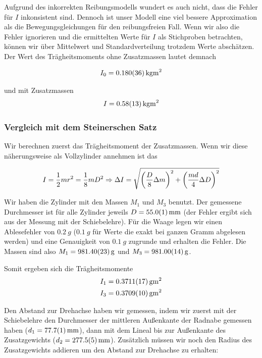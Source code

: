 \documentclass[a4paper,german,12pt,smallheadings]{scrartcl}
\begin{document}
Aufgrund des inkorrekten Reibungsmodells wundert es auch nicht, dass die Fehler
für $I$ inkonsistent sind. Dennoch ist unser Modell eine viel bessere
Approximation als die Bewegungsgleichungen für den reibungsfreien Fall. Wenn
wir also die Fehler ignorieren und die ermittelten Werte für $I$ als
Stichproben betrachten, können wir über Mittelwert und Standardverteilung
trotzdem Werte abschätzen. Der Wert des Trägheitsmoments ohne Zusatzmassen
lautet demnach

\begin{equation}
  I_0 = \SI{0.180+-0.036}{kg m^2}
\end{equation}

und mit Zusatzmassen
\begin{equation}
  I = \SI{0.58+-0.13}{kg m^2}
\end{equation}

\subsubsection{Vergleich mit dem Steinerschen Satz}
Wir berechnen zuerst das Trägheitsmoment der Zusatzmassen. Wenn wir diese
näherungsweise als Vollzylinder annehmen ist das

\begin{equation}
  I = \frac{1}{2} m r^2 = \frac{1}{8} mD^2 \Rightarrow
  \Delta I = \sqrt{\del{\frac{D}{8} \Delta m}^2 + \del{\frac{md}{4} \Delta D}^2}
\end{equation}

Wir haben die Zylinder mit den Massen $M_1$ und $M_3$ benutzt. Der gemessene
Durchmesser ist für alle Zylinder jeweils $D = \SI{55.0+-0.1}{mm}$ (der Fehler
ergibt sich aus der Messung mit der Schiebelehre). Für die Waage legen wir
einen Ablesefehler von $\SI{0.2}{g}$ ($\SI{0.1}{g}$ für Werte die exakt bei
ganzen Gramm abgelesen werden) und eine Genauigkeit von $\SI{0.1}{g}$ zugrunde
und erhalten die Fehler. Die Massen sind also $M_1 = \SI{981.4+-0.23}{g}$ und $M_3 =
\SI{981.0+-0.14}{g}$.

Somit ergeben sich die Trägheitsmomente
\begin{align*}
  I_1 &= \SI{0.3711+-0.0017}{g m^2} \\
  I_3 &= \SI{0.3709+-0.0010}{g m^2}
\end{align*}

Den Abstand zur Drehachse haben wir gemessen, indem wir zuerst mit der
Schiebelehre den Durchmesser der mittleren Außenkante der Radnabe gemessen
haben ($d_1 = \SI{77.7+-0.1}{mm}$), dann mit dem Lineal bis zur Außenkante des
Zusatzgewichts ($d_2 = \SI{277.5+-0.5}{mm}$). Zusätzlich müssen wir noch den
Radius des Zusatzgewichts addieren um den Abstand zur Drehachse zu erhalten:
\end{document}
